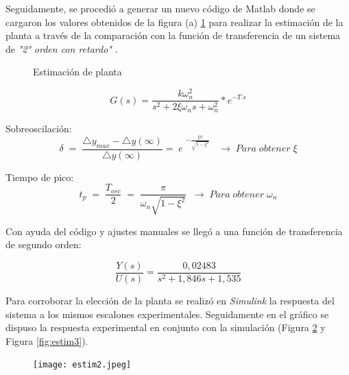     Seguidamente, se procedió a generar un nuevo código de Matlab donde se cargaron los valores obtenidos de la figura (a) \ref{fig:pl2} para realizar la estimación de la planta a través de la comparación con la función de transferencia de un sistema de \textit{"2° orden con retardo"} \cite{pomares2011sistemas}.
    
    \begin{figure}[htbp]
    	\centering
    	\caption{Estimación de planta} \label{fig:pl2}
    \end{figure}

 \begin{equation}
 	G(s)=\frac{k\omega_n^2}{s^2+2\xi\omega_ns+\omega_n^2}\ast e^{-T.s}
 \end{equation}

Sobreoscilación: 
\begin{equation}
	\delta\;=\;\frac{\triangle y_{max}-\triangle y\left(\infty\right)}{\triangle y\left(\infty\right)}=\;e\;^{-\frac{\xi\pi}{\sqrt{1-\xi^2}}}\;\;\;\rightarrow\;Para\;obtener\;\xi
\end{equation}

Tiempo de pico: 
\begin{equation}
t_p\;=\;\frac{T_{osc}}2\;=\;\frac\pi{\omega_n\sqrt{1-\xi^2}}\;\;\rightarrow\;Para\;obtener\;\omega_n
\end{equation}

    
    Con ayuda del código y ajustes manuales se llegó a una función de transferencia de segundo orden:
    
    \begin{equation}
    	\frac{Y(s)}{U(s)}=\frac{0,02483}{s^2+1,846s+1,535}
    \end{equation}
   
    
    
    Para corroborar la elección de la planta se realizó en \textit{Simulink} la respuesta del sistema a los mismos escalones experimentales. Seguidamente en el gráfico se dispuso la respuesta experimental en conjunto con la simulación (Figura \ref{fig:estim2} y Figura \ref{fig:estim3}).
    
    \begin{figure}[htb]
    	\centering
    	\texttt{[image: estim2.jpeg]}
    	\label{fig:estim2}
    \end{figure}

